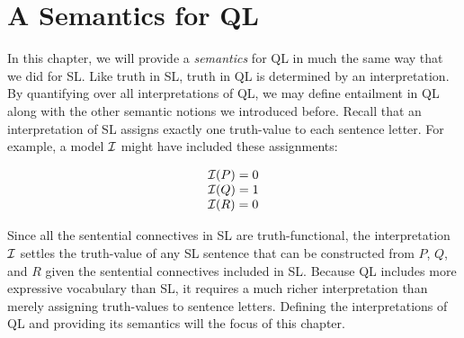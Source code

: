 ﻿%
\chapter{A Semantics for QL}
\label{ch.QL.models}




In this chapter, we will provide a \emph{semantics} for QL in much the same way that we did for SL.
Like truth in SL, truth in QL is determined by an interpretation.
By quantifying over all interpretations of QL, we may define entailment in QL along with the other semantic notions we introduced before.
Recall that an interpretation of SL assigns exactly one truth-value to each sentence letter.
For example, a model $\mathcal{I}$ might have included these assignments:

\begin{displaymath}
	\begin{array}{ll}
    \mathcal{I}(P) = 0\\
    \mathcal{I}(Q) = 1\\
    \mathcal{I}(R) = 0
	\end{array}
\end{displaymath}

Since all the sentential connectives in SL are truth-functional, the interpretation $\mathcal{I}$ settles the truth-value of any SL sentence that can be constructed from $P$, $Q$, and $R$ given the sentential connectives included in SL.
Because QL includes more expressive vocabulary than SL, it requires a much richer interpretation than merely assigning truth-values to sentence letters.
Defining the interpretations of QL and providing its semantics will the focus of this chapter.






